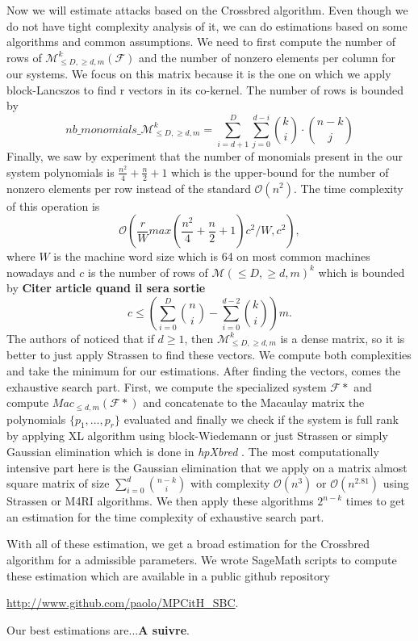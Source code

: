 \documentclass[english]{article}
\begin{document}
		Now we will estimate attacks based on the Crossbred algorithm. Even though we do not have tight complexity analysis of it, we can do estimations based on some algorithms and common assumptions.
		We need to first compute the number of rows of $\mathcal{M}_{\leq D, \geq d, m}^k(\mathcal{F})$ and the number of nonzero elements per column for our systems. We focus on this matrix because it is the one on which we apply block-Lancszos to find r vectors in its co-kernel.
		The number of rows is bounded by $$nb\_monomials\_\mathcal{M}_{\leq D, \geq d, m}^k = \sum_{i=d+1}^{D}\sum_{j=0}^{d-i} \binom{k}{i} \cdot \binom{n-k}{j}$$
		Finally, we saw by experiment that the number of monomials present in the our system polynomials is $\frac{n^2}{4} + \frac{n}{2} + 1$ which is the upper-bound for the number of nonzero elements per row instead of the standard $\mathcal{O}(n^2)$. The time complexity of this operation is 
		$$
		\mathcal{O}\left(\frac{r}{W}max(\frac{n^2}{4} + \frac{n}{2} + 1)c^2/W, c^2\right),
		$$
		where $W$ is the machine word size which is 64 on most common machines nowadays and $c$ is the number of rows of $\mathcal{M}(\leq D, \geq d, m)^k$ which is bounded by \textbf{Citer article quand il sera sortie}
		$$
			c \leq \left(\sum_{i=0}^{D}\binom{n}{i} - \sum_{i=0}^{d-2}\binom{k}{i}\right)m.
		$$
		The authors of \cite{MQOMv2} noticed that if $d \geq 1$, then $\mathcal{M}_{\leq D, \geq d, m}^k$ is a dense matrix, so it is better to just apply Strassen to find these vectors. We compute both complexities and take the minimum for our estimations.
		After finding the vectors, comes the exhaustive search part. First, we compute the specialized system $\mathcal{F}*$ and compute $Mac_{\leq d, m}(\mathcal{F}*)$ and concatenate to the Macaulay matrix the polynomials $\{p_1,\dots,p_r\}$ evaluated and finally we check if the system is full rank by applying XL algorithm using block-Wiedemann or just Strassen or simply Gaussian elimination which is done in \textit{hpXbred} \cite{BS23}. The most computationally intensive part here is the Gaussian elimination that we apply on a matrix almost square matrix of size $\sum_{i=0}^{d}\binom{n-k}{i}$ with complexity $\mathcal{O}(n^3)$ or $\mathcal{O}(n^{2.81})$ using Strassen or M4RI algorithms. We then apply these algorithms $2^{n-k}$ times to get an estimation for the time complexity of exhaustive search part.
		
		With all of these estimation, we get a broad estimation for the Crossbred algorithm for a admissible parameters. We wrote SageMath scripts to compute these estimation which are available in a public github repository
		\begin{center}
			\href{http://www.github.com/paolo/MPCitH_SBC}{http://www.github.com/paolo/MPCitH\_SBC}.
		\end{center}
		Our best estimations are...\textbf{A suivre}.
		
\end{document}
